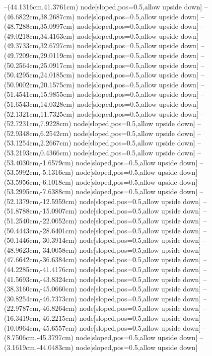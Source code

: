 --(44.1316cm,41.3761cm) node[sloped,pos=0.5,allow upside down]{\ArrowIn}
--(46.6822cm,38.2687cm) node[sloped,pos=0.5,allow upside down]{\ArrowIn}
--(48.7288cm,35.0997cm) node[sloped,pos=0.5,allow upside down]{\ArrowIn}
--(49.0218cm,34.4163cm) node[sloped,pos=0.5,allow upside down]{\arrowIn}
--(49.3733cm,32.6797cm) node[sloped,pos=0.5,allow upside down]{\ArrowIn}
--(49.7209cm,29.0119cm) node[sloped,pos=0.5,allow upside down]{\ArrowIn}
--(50.2564cm,25.0917cm) node[sloped,pos=0.5,allow upside down]{\ArrowIn}
--(50.4295cm,24.0185cm) node[sloped,pos=0.5,allow upside down]{\ArrowIn}
--(50.9002cm,20.1575cm) node[sloped,pos=0.5,allow upside down]{\ArrowIn}
--(51.4541cm,15.9855cm) node[sloped,pos=0.5,allow upside down]{\ArrowIn}
--(51.6543cm,14.0328cm) node[sloped,pos=0.5,allow upside down]{\ArrowIn}
--(52.1321cm,11.7325cm) node[sloped,pos=0.5,allow upside down]{\ArrowIn}
--(52.7231cm,7.9228cm) node[sloped,pos=0.5,allow upside down]{\ArrowIn}
--(52.9348cm,6.2542cm) node[sloped,pos=0.5,allow upside down]{\ArrowIn}
--(53.1254cm,2.2667cm) node[sloped,pos=0.5,allow upside down]{\ArrowIn}
--(53.2193cm,0.4366cm) node[sloped,pos=0.5,allow upside down]{\ArrowIn}
--(53.4030cm,-1.6579cm) node[sloped,pos=0.5,allow upside down]{\ArrowIn}
--(53.5992cm,-5.1316cm) node[sloped,pos=0.5,allow upside down]{\ArrowIn}
--(53.5956cm,-6.1018cm) node[sloped,pos=0.5,allow upside down]{\arrowIn}
--(53.2995cm,-7.6388cm) node[sloped,pos=0.5,allow upside down]{\ArrowIn}
--(52.1379cm,-12.5959cm) node[sloped,pos=0.5,allow upside down]{\ArrowIn}
--(51.8788cm,-15.0907cm) node[sloped,pos=0.5,allow upside down]{\ArrowIn}
--(51.2540cm,-22.0052cm) node[sloped,pos=0.5,allow upside down]{\ArrowIn}
--(50.4443cm,-28.6401cm) node[sloped,pos=0.5,allow upside down]{\ArrowIn}
--(50.1446cm,-30.3914cm) node[sloped,pos=0.5,allow upside down]{\ArrowIn}
--(48.9623cm,-34.0058cm) node[sloped,pos=0.5,allow upside down]{\ArrowIn}
--(47.6642cm,-36.6384cm) node[sloped,pos=0.5,allow upside down]{\ArrowIn}
--(44.2285cm,-41.4176cm) node[sloped,pos=0.5,allow upside down]{\ArrowIn}
--(41.5693cm,-43.8324cm) node[sloped,pos=0.5,allow upside down]{\ArrowIn}
--(38.3160cm,-45.0660cm) node[sloped,pos=0.5,allow upside down]{\ArrowIn}
--(30.8254cm,-46.7373cm) node[sloped,pos=0.5,allow upside down]{\ArrowIn}
--(22.9787cm,-46.8264cm) node[sloped,pos=0.5,allow upside down]{\ArrowIn}
--(16.3419cm,-46.2215cm) node[sloped,pos=0.5,allow upside down]{\ArrowIn}
--(10.0964cm,-45.6557cm) node[sloped,pos=0.5,allow upside down]{\ArrowIn}
--(8.7506cm,-45.3797cm) node[sloped,pos=0.5,allow upside down]{\ArrowIn}
--(3.1619cm,-44.0483cm) node[sloped,pos=0.5,allow upside down]{\ArrowIn}
